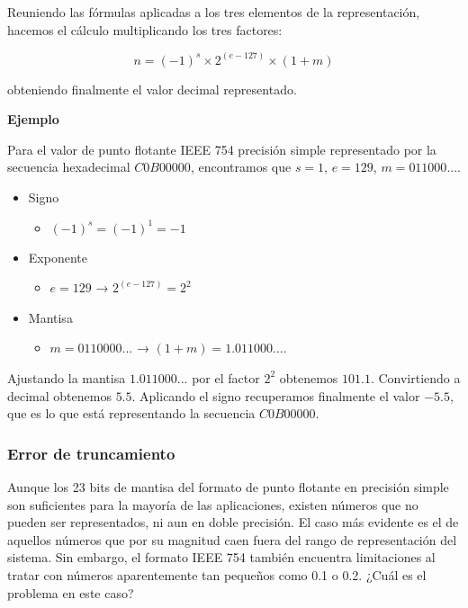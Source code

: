 \documentclass[spanish,A4,]{article}
\begin{document}
Reuniendo las fórmulas aplicadas a los tres elementos de la
representación, hacemos el cálculo multiplicando los tres factores:

\[n = (-1)^s \times 2^{(e-127)}  \times (1+m)\]

obteniendo finalmente el valor decimal representado.

\textbf{Ejemplo}

Para el valor de punto flotante IEEE 754 precisión simple representado
por la secuencia hexadecimal $C0B00000$, encontramos que $s=1$, $e=129$,
$m=011000...$.

\begin{itemize}
\itemsep1pt\parskip0pt
\item
  Signo

  \begin{itemize}
  \itemsep1pt\parskip0pt
  \item
    $(-1)^s = (-1)^1 = -1$
  \end{itemize}
\item
  Exponente

  \begin{itemize}
  \itemsep1pt\parskip0pt
  \item
    $e = 129$ → $2^{(e-127)} = 2^2$
  \end{itemize}
\item
  Mantisa

  \begin{itemize}
  \itemsep1pt\parskip0pt
  \item
    $m = 0110000...$ → $(1 + m) = 1.011000....$
  \end{itemize}
\end{itemize}

Ajustando la mantisa $1.011000...$ por el factor $2^2$ obtenemos
$101.1$. Convirtiendo a decimal obtenemos $5.5$. Aplicando el signo
recuperamos finalmente el valor $-5.5$, que es lo que está representando
la secuencia $C0B00000$.

\subsubsection{Error de truncamiento}\label{error-de-truncamiento}

Aunque los 23 bits de mantisa del formato de punto flotante en precisión
simple son suficientes para la mayoría de las aplicaciones, existen
números que no pueden ser representados, ni aun en doble precisión. El
caso más evidente es el de aquellos números que por su magnitud caen
fuera del rango de representación del sistema. Sin embargo, el formato
IEEE 754 también encuentra limitaciones al tratar con números
aparentemente tan pequeños como 0.1 o 0.2. ¿Cuál es el problema en este
caso?
\end{document}
